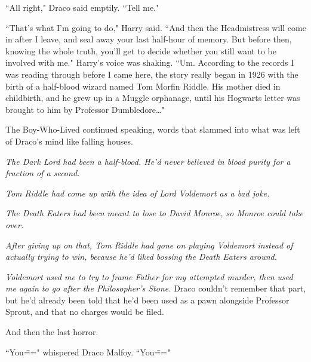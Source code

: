 ``All right," Draco said emptily. ``Tell me."

``That's what I'm going to do," Harry said. ``And then the Headmistress will come in after I leave, and seal away your last half-hour of memory. But before then, knowing the whole truth, you'll get to decide whether you still want to be involved with me." Harry's voice was shaking. ``Um. According to the records I was reading through before I came here, the story really began in 1926 with the birth of a half-blood wizard named Tom Morfin Riddle. His mother died in childbirth, and he grew up in a Muggle orphanage, until his Hogwarts letter was brought to him by Professor Dumbledore{\ldots}"

The Boy-Who-Lived continued speaking, words that slammed into what was left of Draco's mind like falling houses.

\emph{The Dark Lord had been a half-blood. He'd never believed in blood purity for a fraction of a second.}

\emph{Tom Riddle had come up with the idea of Lord Voldemort as a bad joke.}

\emph{The Death Eaters had been meant to lose to David Monroe, so Monroe could take over.}

\emph{After giving up on that, Tom Riddle had gone on playing Voldemort instead of actually trying to win, because he'd liked bossing the Death Eaters around.}

\emph{Voldemort used me to try to frame Father for my attempted murder, then used me again to go after the Philosopher's Stone.} Draco couldn't remember that part, but he'd already been told that he'd been used as a pawn alongside Professor Sprout, and that no charges would be filed.

And then the last horror.

``You\===" whispered Draco Malfoy. ``You\==="

